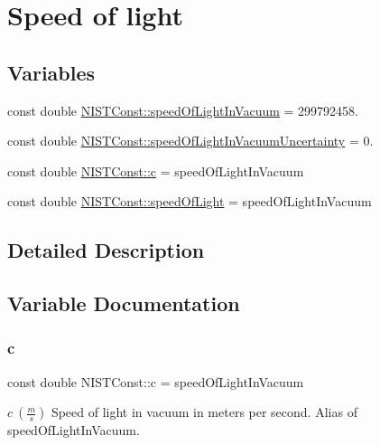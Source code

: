 \hypertarget{group___speed_of_light}{}\section{Speed of light}
\label{group___speed_of_light}
\subsection*{Variables}
\begin{DoxyCompactItemize}
\item 
const double \hyperlink{group___speed_of_light_gacb4a04d9cca33259effabdd28c28e964}{N\+I\+S\+T\+Const\+::speed\+Of\+Light\+In\+Vacuum} = 299792458.
\item 
const double \hyperlink{group___speed_of_light_gafb67b7afe777d6e23a70ae69e83542d1}{N\+I\+S\+T\+Const\+::speed\+Of\+Light\+In\+Vacuum\+Uncertainty} = 0.
\item 
const double \hyperlink{group___speed_of_light_ga2bd39b3a464ca74134be618ed1cf1798}{N\+I\+S\+T\+Const\+::c} = speed\+Of\+Light\+In\+Vacuum
\item 
const double \hyperlink{group___speed_of_light_ga0be1be2f994cccb0cc27bac50f6dd7a3}{N\+I\+S\+T\+Const\+::speed\+Of\+Light} = speed\+Of\+Light\+In\+Vacuum
\end{DoxyCompactItemize}


\subsection{Detailed Description}


\subsection{Variable Documentation}
\mbox{\label{group___speed_of_light_ga2bd39b3a464ca74134be618ed1cf1798}} 
\subsubsection{\texorpdfstring{c}{c}}
{\footnotesize\ttfamily const double N\+I\+S\+T\+Const\+::c = speed\+Of\+Light\+In\+Vacuum}

$c \ (\frac{m}{s})$ Speed of light in vacuum in meters per second. Alias of speed\+Of\+Light\+In\+Vacuum. \mbox{\label{group___speed_of_light_ga0be1be2f994cccb0cc27bac50f6dd7a3}} 
